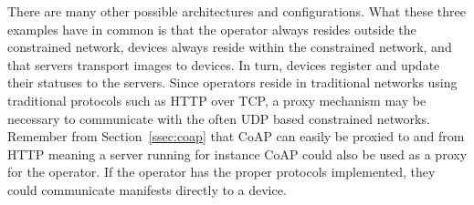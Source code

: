 \documentclass[0-thesis.tex]{subfiles}
\begin{document}
There are many other possible architectures and configurations. What these three examples
have in common is that the operator always resides outside the constrained network,
devices always reside within the constrained network, and that servers transport images to
devices. In turn, devices register and update their statuses to the servers. Since
operators reside in traditional networks using traditional protocols such as HTTP over
TCP, a proxy mechanism may be necessary to communicate with the often UDP based
constrained networks. Remember from Section~\ref{ssec:coap} that CoAP can easily be
proxied to and from HTTP meaning a server running for instance CoAP could also be used as
a proxy for the operator. If the operator has the proper protocols implemented, they could
communicate manifests directly to a device.
\end{document}
